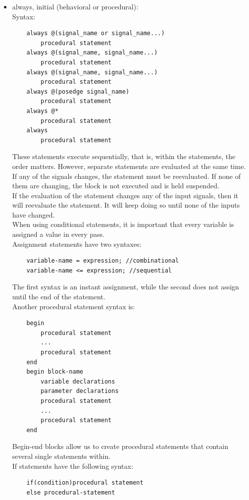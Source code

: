 \documentclass[nobib]{tufte-handout}
\begin{document}
\begin{itemize}
    \item always, initial (behavioral or procedural):\\
    Syntax:
    \begin{lstlisting}
    always @(signal_name or signal_name...)
        procedural statement
    always @(signal_name, signal_name...)
        procedural statement
    always @(signal_name, signal_name...)
        procedural statement
    always @(posedge signal_name)
        procedural statement
    always @*
        procedural statement
    always
        procedural statement
    \end{lstlisting}
    These statements execute sequentially, that is, within the statements, the order matters. However, separate statements are evaluated at the same time.\\
    If any of the signals changes, the statement must be reevaluated. If none of them are changing, the block is not executed and is held suspended.\\
    If the evaluation of the statement changes any of the input signals, then it will reevaluate the statement. It will keep doing so until none of the inputs have changed.\\
    When using conditional statements, it is important that every variable is assigned a value in every pass.\\
    Assignment statements have two syntaxes:
    \begin{lstlisting}
    variable-name = expression; //combinational
    variable-name <= expression; //sequential
    \end{lstlisting}
    The first syntax is an instant assignment, while the second does not assign until the end of the statement.\\
    Another procedural statement syntax is:
    \begin{lstlisting}
    begin
        procedural statement
        ...
        procedural statement
    end
    begin block-name
        variable declarations
        parameter declarations
        procedural statement
        ... 
        procedural statement
    end
    \end{lstlisting}
    Begin-end blocks allow us to create procedural statements that contain several single statements within.\\
    If statements have the following syntax:
    \begin{lstlisting}
    if(condition)procedural statement
    else procedural-statement
    \end{lstlisting}

\end{itemize}
\end{document}
